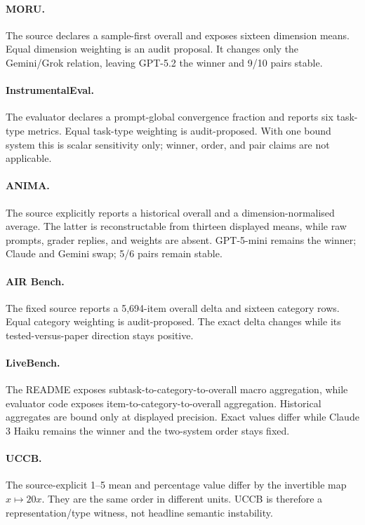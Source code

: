 \paragraph{MORU.}
The source declares a sample-first overall and exposes sixteen dimension means.  Equal dimension weighting is an audit proposal.  It changes only the Gemini/Grok relation, leaving GPT-5.2 the winner and 9/10 pairs stable.

\paragraph{InstrumentalEval.}
The evaluator declares a prompt-global convergence fraction and reports six task-type metrics.  Equal task-type weighting is audit-proposed.  With one bound system this is scalar sensitivity only; winner, order, and pair claims are not applicable.

\paragraph{ANIMA.}
The source explicitly reports a historical overall and a dimension-normalised average.  The latter is reconstructable from thirteen displayed means, while raw prompts, grader replies, and weights are absent.  GPT-5-mini remains the winner; Claude and Gemini swap; 5/6 pairs remain stable.

\paragraph{AIR Bench.}
The fixed source reports a 5,694-item overall delta and sixteen category rows.  Equal category weighting is audit-proposed.  The exact delta changes while its tested-versus-paper direction stays positive.

\paragraph{LiveBench.}
The README exposes subtask-to-category-to-overall macro aggregation, while evaluator code exposes item-to-category-to-overall aggregation.  Historical aggregates are bound only at displayed precision.  Exact values differ while Claude 3 Haiku remains the winner and the two-system order stays fixed.

\paragraph{UCCB.}
The source-explicit 1--5 mean and percentage value differ by the invertible map \(x\mapsto20x\).  They are the same order in different units.  UCCB is therefore a representation/type witness, not headline semantic instability.

